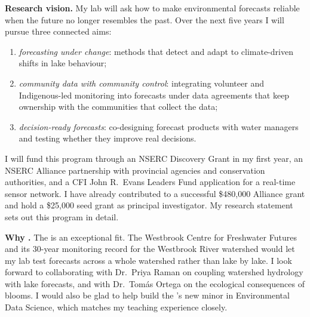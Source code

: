 \begin{coverletter}

\textbf{Research vision.} My lab will ask how to make environmental forecasts
reliable when the future no longer resembles the past. Over the next five
years I will pursue three connected aims:
\begin{enumerate}[label=(\arabic*)]
  \item \emph{forecasting under change}: methods that detect and adapt to
        climate-driven shifts in lake behaviour;
  \item \emph{community data with community control}: integrating
        volunteer and Indigenous-led monitoring into forecasts under data
        agreements that keep ownership with the communities that collect
        the data;
  \item \emph{decision-ready forecasts}: co-designing forecast products with
        water managers and testing whether they improve real decisions.
\end{enumerate}
I will fund this program through an NSERC Discovery Grant in my first
year, an NSERC Alliance partnership with provincial agencies and
conservation authorities, and a CFI John R.\ Evans Leaders Fund application
for a real-time sensor network. I have already contributed to a successful
\$480{,}000 Alliance grant and hold a \$25{,}000 seed grant as principal
investigator. My research statement sets out this program in detail.


\textbf{Why \Institution.} The \Department is an exceptional fit. The
Westbrook Centre for Freshwater Futures and its 30-year monitoring record
for the Westbrook River watershed would let my lab test forecasts
across a whole watershed rather than lake by lake. I look forward to
collaborating with Dr.~Priya Raman on coupling watershed hydrology with lake
forecasts, and with Dr.~Tom\'as Ortega on the ecological consequences of
blooms. I would also be glad to help build the \Faculty's new minor in
Environmental Data Science, which matches my teaching experience closely.


\end{coverletter}

